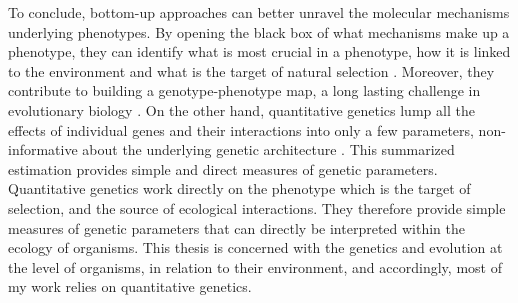 
To conclude, bottom-up approaches can better unravel the molecular mechanisms underlying phenotypes. By opening the black box of what mechanisms make up a phenotype, they can identify what is most crucial in a phenotype, how it is linked to the environment and what is the target of natural selection \parencite{DeJong2014}. Moreover, they contribute to building a genotype-phenotype map, a long lasting challenge in evolutionary biology \parencite{Kirschner2010}.
On the other hand, quantitative genetics lump all the effects of individual genes and their interactions into only a few parameters, non-informative about the underlying genetic architecture \parencite{Mackay2001,Nietlisbach2015,Huang041434}.  This summarized estimation provides simple and direct measures of genetic parameters. Quantitative genetics work directly on the phenotype which is the target of selection, and the source of ecological interactions. They therefore provide simple measures of genetic parameters that can directly be interpreted within the ecology of organisms.
This thesis is concerned with the genetics and evolution at the level of organisms, in relation to their environment, and accordingly, most of my work relies on quantitative genetics.




